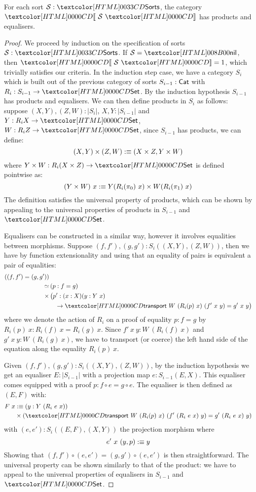 \begin{lemma}
\label{thm:lim-sorts}
  For each sort $\Ss : \Sorts$, the category $\SortCat{\Ss}$ has
  products and equalisers.
\end{lemma}
\begin{proof}
We proceed by induction on the specification of sorts $\Ss : \Sorts$.
If $\Ss = \nil$, then $\SortCat{\Ss} = 1$, which trivially satisfies
our criteria. In the induction step case, we have a category $S_i$
which is built out of the previous category of sorts $S_{i-1} : \mathsf{Cat}$
with $R_i : S_{i-1} \to \Set$. By the induction hypothesis $S_{i-1}$
has products and equalisers. We can then define products in $S_{i}$
as follows: suppose $(X,Y), (Z,W) : | S_{i} |$, \ie $X, Y : | S_{i-1} |$
and $Y : R_i X \to \Set$, $W : R_i Z \to \Set$, since $S_{i-1}$ has
products, we can define:
\[
(X,Y) \times (Z,W) :\equiv (X \times Z , Y \times W)
\]
where $Y \times W : R_i (X \times Z) \to \Set$ is defined pointwise
as:
\[
(Y \times W)\ x :\equiv Y (R_i(\pi_0)\ x) \times W (R_i(\pi_1)\ x)
\]
The definition satisfies the universal property of products, which can
be shown by appealing to the universal properties of products in
$S_{i-1}$ and $\Set$.

Equalisers can be constructed in a similar way, however it involves
equalities between morphisms. Suppose
$(f,f'), (g,g') : S_i((X,Y),(Z,W))$, then we have by function
extensionality and using that an equality of pairs is equivalent a pair of
equalities:
%
\begin{align*}
 ((f,f') = (g,g'))& \\
\simeq &\, (p : f = g) \\
\times &\, \big(p' : (x : X) (y : Y\ x) \\
&\ \ \ \to \transport\ W\ (R_i(p)\ x)\ (f'\ x\ y) = g'\ x\ y\big)
\end{align*}
%
where we denote the action of $R_i$ on a proof of equality $p : f = g$
by $R_i(p)\ x : R_i(f)\ x = R_i(g)\ x$. Since
$f'\ x\ y : W\ (R_i(f)\ x)$ and $g'\ x\ y : W\ (R_i(g)\ x)$, we have
to transport (or coerce) the left hand side of the equation along the
equality $R_i(p)\ x$.

Given $(f,f'), (g,g') : S_i((X,Y),(Z,W))$, by the induction hypothesis
we get an equaliser $E : |S_{i-1}|$ with a projection map
$e : S_{i-1}(E,X)$. This equaliser comes equipped with a proof
$p : f \circ e = g \circ e$. The equaliser is then defined as $(E,F)$
with:
\begin{align*}
F\ x & \ddefeq (y : Y\ (R_i\ e\ x)) \\
& \times (\transport\ W\ (R_i(p)\ x)\ (f'\ (R_i\ e\ x)\ y) = g'\ (R_i\ e\ x)\ y)
\end{align*}
with $(e,e') : S_i((E,F),(X,Y))$ the projection morphism where
\[
e'\ x\ (y , p) :\equiv y
\]
Showing that $(f,f') \circ (e,e') = (g,g') \circ (e,e')$ is then
straightforward. The universal property can be shown similarly to that
of the product: we have to appeal to the universal properties of
equalisers in $S_{i-1}$ and $\Set$.
\end{proof}

